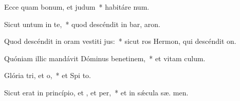 \item Ecce quam bonum, et  judum~* habitáre   num.
\item Sicut untum in te,~* quod descéndit in bar,  aron.
\item Quod descéndit in oram vestiti jus:~* sicut ros Hermon, qui descéndit   on.
\item Quóniam illic mandávit Dóminus benetinem,~* et vitam   culum.
\item Glória tri, et o,~* et Spi to.
\item Sicut erat in princípio, et , et per,~* et in sǽcula sæ. men.
